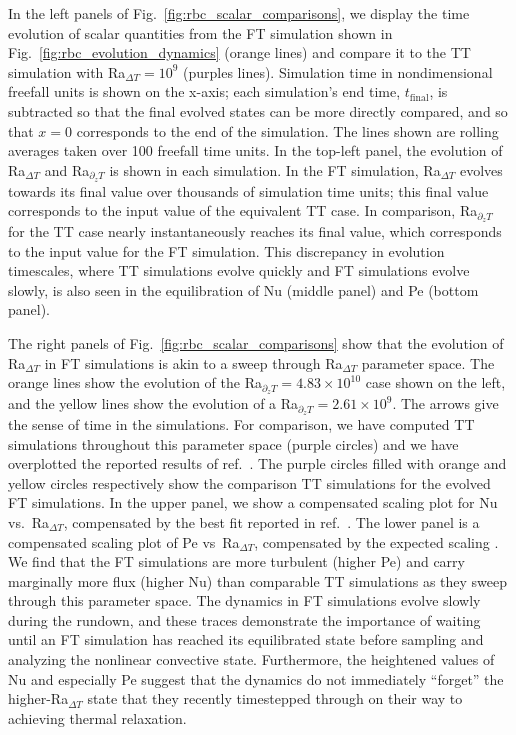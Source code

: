 \documentclass[aps, pre, onecolumn, nofootinbib, notitlepage, groupedaddress, amsfonts, amssymb, amsmath, longbibliography, superscriptaddress]{revtex4-1}
\begin{document}
In the left panels of Fig.~\ref{fig:rbc_scalar_comparisons}, we display the time evolution of scalar quantities from the FT simulation shown in Fig.~\ref{fig:rbc_evolution_dynamics} (orange lines) and compare it to the TT simulation with Ra$_{\Delta T} = 10^9$ (purples lines).
Simulation time in nondimensional freefall units is shown on the x-axis; each simulation's end time, $t_{\text{final}}$, is subtracted so that the final evolved states can be more directly compared, and so that $x = 0$ corresponds to the end of the simulation.
The lines shown are rolling averages taken over 100 freefall time units.
In the top-left panel, the evolution of Ra$_{\Delta T}$ and Ra$_{\partial_z T}$ is shown in each simulation.
In the FT simulation, Ra$_{\Delta T}$ evolves towards its final value over thousands of simulation time units; this final value corresponds to the input value of the equivalent TT case.
In comparison, Ra$_{\partial_z T}$ for the TT case nearly instantaneously reaches its final value, which corresponds to the input value for the FT simulation.
This discrepancy in evolution timescales, where TT simulations evolve quickly and FT simulations evolve slowly, is also seen in the equilibration of Nu (middle panel) and Pe (bottom panel).

The right panels of Fig.~\ref{fig:rbc_scalar_comparisons} show that the evolution of Ra$_{\Delta T}$ in FT simulations is akin to a sweep through Ra$_{\Delta T}$ parameter space.
The orange lines show the evolution of the Ra$_{\partial_z T} = 4.83 \times 10^{10}$ case shown on the left, and the yellow lines show the evolution of a Ra$_{\partial_z T} = 2.61 \times 10^{9}$.
The arrows give the sense of time in the simulations.
For comparison, we have computed TT simulations throughout this parameter space (purple circles) and we have overplotted the reported results of ref.~\cite{zhu&all2018}.
The purple circles filled with orange and yellow circles respectively show the comparison TT simulations for the evolved FT simulations.
In the upper panel, we show a compensated scaling plot for Nu vs.~Ra$_{\Delta T}$, compensated by the best fit reported in ref.~\cite{johnston&doering2009}.
The lower panel is a compensated scaling plot of Pe vs~Ra$_{\Delta T}$, compensated by the expected scaling \cite{ahlers&all2009}.
We find that the FT simulations are more turbulent (higher Pe) and carry marginally more flux (higher Nu) than comparable TT simulations as they sweep through this parameter space.
The dynamics in FT simulations evolve slowly during the rundown, and these traces demonstrate the importance of waiting until an FT simulation has reached its equilibrated state before sampling and analyzing the nonlinear convective state.
Furthermore, the heightened values of Nu and especially Pe suggest that the dynamics do not immediately ``forget'' the higher-Ra$_{\Delta T}$ state that they recently timestepped through on their way to achieving thermal relaxation.
\end{document}
